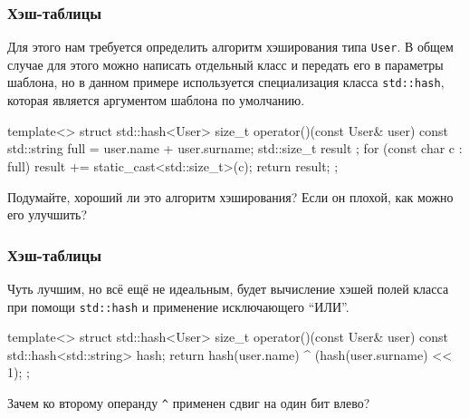 \documentclass[compress, 8pt, aspectratio=169]{beamer}
\begin{document}
  \begin{frame}[fragile]

    \frametitle{Хэш-таблицы}

    Для этого нам требуется определить алгоритм хэширования
    типа \texttt{User}.
    В общем случае для этого можно написать отдельный класс и передать
    его в параметры шаблона, но в данном примере используется
    специализация класса \texttt{std::hash}, которая является
    аргументом шаблона по умолчанию.

    \begin{mycppinplacelisting}
template<>
struct std::hash<User> {
    size_t operator()(const User& user) const {
        std::string full = user.name + user.surname;
        std::size_t result {};
        for (const char c : full) {
            result += static_cast<std::size_t>(c);
        }
        return result;
    }
};
    \end{mycppinplacelisting}

    \begin{task}
      Подумайте, хороший ли это алгоритм хэширования?
      Если он плохой, как можно его улучшить?
    \end{task}

  \end{frame}

  \begin{frame}[fragile]

    \frametitle{Хэш-таблицы}

    Чуть лучшим, но всё ещё не идеальным, будет
    вычисление хэшей полей класса при помощи \texttt{std::hash}
    и применение исключающего \enquote{ИЛИ}.

    \begin{mycppinplacelisting}
template<>
struct std::hash<User> {
    size_t operator()(const User& user) const {
        std::hash<std::string> hash;
        return hash(user.name) ^ (hash(user.surname) << 1);
    }
};
    \end{mycppinplacelisting}

    \begin{task}
      Зачем ко второму операнду \verb|^| применен сдвиг на один бит
      влево?
    \end{task}

  \end{frame}
\end{document}
